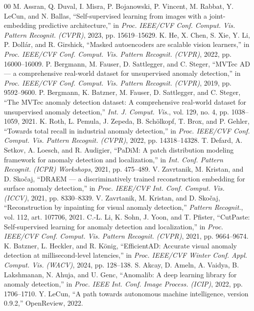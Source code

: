 \documentclass[conference]{IEEEtran}
\begin{document}
\begin{thebibliography}{00}
 M. Assran, Q. Duval, I. Misra, P. Bojanowski, P. Vincent, M. Rabbat, Y. LeCun, and N. Ballas, ``Self-supervised learning from images with a joint-embedding predictive architecture,'' in \emph{Proc. IEEE/CVF Conf. Comput. Vis. Pattern Recognit. (CVPR)}, 2023, pp. 15619--15629.
 K. He, X. Chen, S. Xie, Y. Li, P. Doll\'ar, and R. Girshick, ``Masked autoencoders are scalable vision learners,'' in \emph{Proc. IEEE/CVF Conf. Comput. Vis. Pattern Recognit. (CVPR)}, 2022, pp. 16000--16009.
 P. Bergmann, M. Fauser, D. Sattlegger, and C. Steger, ``MVTec AD --- a comprehensive real-world dataset for unsupervised anomaly detection,'' in \emph{Proc. IEEE/CVF Conf. Comput. Vis. Pattern Recognit. (CVPR)}, 2019, pp. 9592--9600.
 P. Bergmann, K. Batzner, M. Fauser, D. Sattlegger, and C. Steger, ``The MVTec anomaly detection dataset: A comprehensive real-world dataset for unsupervised anomaly detection,'' \emph{Int. J. Comput. Vis.}, vol. 129, no. 4, pp. 1038--1059, 2021.
 K. Roth, L. Pemula, J. Zepeda, B. Sch\"olkopf, T. Brox, and P. Gehler, ``Towards total recall in industrial anomaly detection,'' in \emph{Proc. IEEE/CVF Conf. Comput. Vis. Pattern Recognit. (CVPR)}, 2022, pp. 14318--14328.
 T. Defard, A. Setkov, A. Loesch, and R. Audigier, ``PaDiM: A patch distribution modeling framework for anomaly detection and localization,'' in \emph{Int. Conf. Pattern Recognit. (ICPR) Workshops}, 2021, pp. 475--489.
 V. Zavrtanik, M. Kristan, and D. Sko\v{c}aj, ``DRAEM --- a discriminatively trained reconstruction embedding for surface anomaly detection,'' in \emph{Proc. IEEE/CVF Int. Conf. Comput. Vis. (ICCV)}, 2021, pp. 8330--8339.
 V. Zavrtanik, M. Kristan, and D. Sko\v{c}aj, ``Reconstruction by inpainting for visual anomaly detection,'' \emph{Pattern Recognit.}, vol. 112, art. 107706, 2021.
 C.-L. Li, K. Sohn, J. Yoon, and T. Pfister, ``CutPaste: Self-supervised learning for anomaly detection and localization,'' in \emph{Proc. IEEE/CVF Conf. Comput. Vis. Pattern Recognit. (CVPR)}, 2021, pp. 9664--9674.
 K. Batzner, L. Heckler, and R. K\"onig, ``EfficientAD: Accurate visual anomaly detection at millisecond-level latencies,'' in \emph{Proc. IEEE/CVF Winter Conf. Appl. Comput. Vis. (WACV)}, 2024, pp. 128--138.
 S. Akcay, D. Ameln, A. Vaidya, B. Lakshmanan, N. Ahuja, and U. Genc, ``Anomalib: A deep learning library for anomaly detection,'' in \emph{Proc. IEEE Int. Conf. Image Process. (ICIP)}, 2022, pp. 1706--1710.
 Y. LeCun, ``A path towards autonomous machine intelligence, version 0.9.2,'' OpenReview, 2022.
\end{thebibliography}
\end{document}
